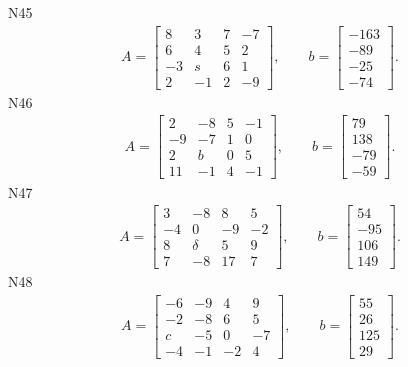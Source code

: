 \documentclass[11pt]{report}
\begin{document}
N45
\begin{align*}
 A = \left[\begin{matrix}8 & 3 & 7 & -7\\6 & 4 & 5 & 2\\-3 & s & 6 & 1\\2 & -1 & 2 & -9\end{matrix}\right],
\qquad b = \left[\begin{matrix}-163\\-89\\-25\\-74\end{matrix}\right]. 
 \end{align*}
N46
\begin{align*}
 A = \left[\begin{matrix}2 & -8 & 5 & -1\\-9 & -7 & 1 & 0\\2 & b & 0 & 5\\11 & -1 & 4 & -1\end{matrix}\right],
\qquad b = \left[\begin{matrix}79\\138\\-79\\-59\end{matrix}\right]. 
 \end{align*}
N47
\begin{align*}
 A = \left[\begin{matrix}3 & -8 & 8 & 5\\-4 & 0 & -9 & -2\\8 & \delta & 5 & 9\\7 & -8 & 17 & 7\end{matrix}\right],
\qquad b = \left[\begin{matrix}54\\-95\\106\\149\end{matrix}\right]. 
 \end{align*}
N48
\begin{align*}
 A = \left[\begin{matrix}-6 & -9 & 4 & 9\\-2 & -8 & 6 & 5\\c & -5 & 0 & -7\\-4 & -1 & -2 & 4\end{matrix}\right],
\qquad b = \left[\begin{matrix}55\\26\\125\\29\end{matrix}\right]. 
 \end{align*}
\end{document}
